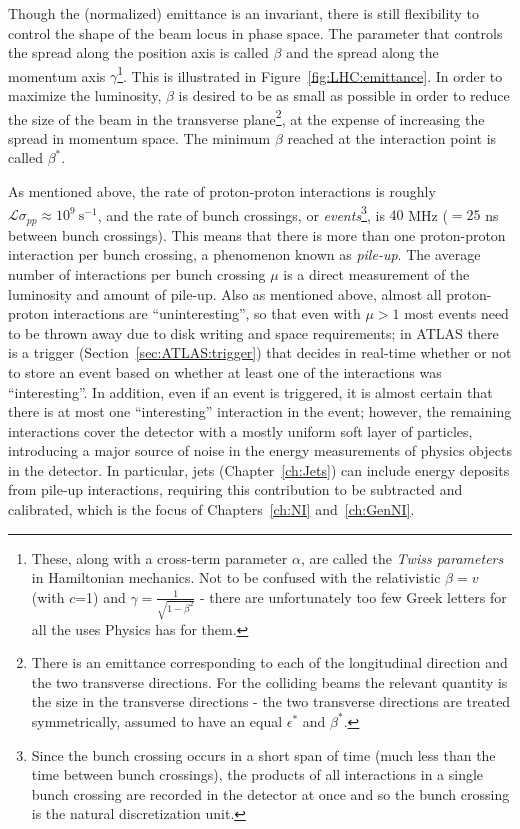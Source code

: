 Though the (normalized) emittance is an invariant, there is still flexibility to control the shape of the beam locus in phase space.
The parameter that controls the spread along the position axis is called $\beta$ and the spread along the momentum axis $\gamma$\footnote{These, along with a cross-term parameter $\alpha$, are called the \textit{Twiss parameters} in Hamiltonian mechanics. Not to be confused with the relativistic $\beta=v$ (with $c$=1) and $\gamma = \frac{1}{\sqrt{1-\beta^2}}$ - there are unfortunately too few Greek letters for all the uses Physics has for them.}.
This is illustrated in Figure~\ref{fig:LHC:emittance}.
In order to maximize the luminosity, $\beta$ is desired to be as small as possible in order to reduce the size of the beam in the transverse plane\footnote{There is an emittance corresponding to each of the longitudinal direction and the two transverse directions. For the colliding beams the relevant quantity is the size in the transverse directions - the two transverse directions are treated symmetrically, assumed to have an equal $\epsilon^*$ and $\beta^*$.}, at the expense of increasing the spread in momentum space.
The minimum $\beta$ reached at the interaction point is called $\beta^*$.

As mentioned above, the rate of proton-proton interactions is roughly $\mathcal{L}\sigma_{pp} \approx 10^9~\text{s}^{-1}$, and the rate of bunch crossings, or \textit{events}\footnote{Since the bunch crossing occurs in a short span of time (much less than the time between bunch crossings), the products of all interactions in a single bunch crossing are recorded in the detector at once and so the bunch crossing is the natural discretization unit.}, is $40$ MHz ($=25$ ns between bunch crossings).
This means that there is more than one proton-proton interaction per bunch crossing, a phenomenon known as \textit{pile-up}.
The average number of interactions per bunch crossing $\mu$ is a direct measurement of the luminosity and amount of pile-up.
Also as mentioned above, almost all proton-proton interactions are ``uninteresting'', so that even with $\mu>1$ most events need to be thrown away due to disk writing and space requirements; in ATLAS there is a trigger (Section~\ref{sec:ATLAS:trigger}) that decides in real-time whether or not to store an event based on whether at least one of the interactions was ``interesting''.
In addition, even if an event is triggered, it is almost certain that there is at most one ``interesting'' interaction in the event; however, the remaining interactions cover the detector with a mostly uniform soft layer of particles, introducing a major source of noise in the energy measurements of physics objects in the detector.
In particular, jets (Chapter~\ref{ch:Jets}) can include energy deposits from pile-up interactions, requiring this contribution to be subtracted and calibrated, which is the focus of Chapters~\ref{ch:NI} and~\ref{ch:GenNI}.

